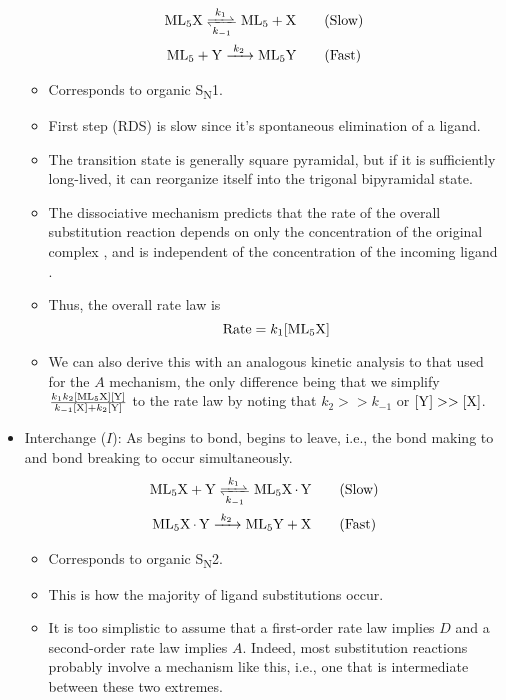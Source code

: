 \documentclass[../notes.tex]{subfiles}
\begin{document}
\begin{itemize}
    \begin{gather*}
        \ce{ML5X <=>[$k_1$][$k_{-1}$] ML5 + X}\tag{Slow}\\
        \ce{ML5 + Y ->[$k_2$] ML5Y}\tag{Fast}
    \end{gather*}
    \begin{itemize}
        \item Corresponds to organic S\textsubscript{N}1.
        \item First step (RDS) is slow since it's spontaneous elimination of a ligand.
        \item The transition state is generally square pyramidal, but if it is sufficiently long-lived, it can reorganize itself into the trigonal bipyramidal state.
        \item The dissociative mechanism predicts that the rate of the overall substitution reaction depends on only the concentration of  the original complex \ce{[ML5X]}, and is independent of the concentration of the incoming ligand \ce{[Y]}.
        \item Thus, the overall rate law is
        \begin{equation*}
            \text{Rate} = k_1\ce{[ML5X]}
        \end{equation*}
        \item We can also derive this with an analogous kinetic analysis to that used for the $A$ mechanism, the only difference being that we simplify $\frac{k_1k_2\ce{[ML5X][Y]}}{k_{-1}\ce{[X]}+k_2\ce{[Y]}}$ to the rate law by noting that $k_2>>k_{-1}$ or $\ce{[Y]}>>\ce{[X]}$.
    \end{itemize}
    \item Interchange ($I$): As  begins to bond,  begins to leave, i.e., the bond making to  and bond breaking to  occur simultaneously.
    \begin{gather*}
        \ce{ML5X + Y <=>[$k_1$][$k_{-1}$] ML5X*Y}\tag{Slow}\\
        \ce{ML5X*Y ->[$k_2$] ML5Y + X}\tag{Fast}
    \end{gather*}
    \begin{itemize}
        \item Corresponds to organic S\textsubscript{N}2.
        \item This is how the majority of ligand substitutions occur.
        \item It is too simplistic to assume that a first-order rate law implies $D$ and a second-order rate law implies $A$. Indeed, most substitution reactions probably involve a mechanism like this, i.e., one that is intermediate between these two extremes.

\end{itemize}
\end{itemize}
\end{document}
